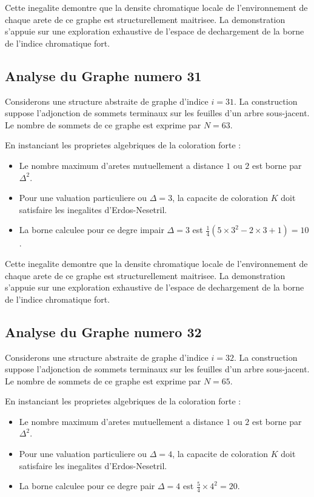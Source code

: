 \documentclass[11pt,a4paper]{article}
\begin{document}
Cette inegalite demontre que la densite chromatique locale de l'environnement de chaque arete de ce graphe est structurellement maitrisee. La demonstration s'appuie sur une exploration exhaustive de l'espace de dechargement de la borne de l'indice chromatique fort.

\subsection{Analyse du Graphe numero 31}
Considerons une structure abstraite de graphe d'indice $i = 31$. La construction suppose l'adjonction de sommets terminaux sur les feuilles d'un arbre sous-jacent. Le nombre de sommets de ce graphe est exprime par $N = 63$.

En instanciant les proprietes algebriques de la coloration forte :
\begin{itemize}
\item Le nombre maximum d'aretes mutuellement a distance $1$ ou $2$ est borne par $\Delta^2$.
\item Pour une valuation particuliere ou $\Delta = 3$, la capacite de coloration $K$ doit satisfaire les inegalites d'Erdos-Nesetril.
\item La borne calculee pour ce degre impair $\Delta = 3$ est $\frac{1}{4}(5 \times 3^2 - 2 \times 3 + 1) = 10$.
\end{itemize}

Cette inegalite demontre que la densite chromatique locale de l'environnement de chaque arete de ce graphe est structurellement maitrisee. La demonstration s'appuie sur une exploration exhaustive de l'espace de dechargement de la borne de l'indice chromatique fort.

\subsection{Analyse du Graphe numero 32}
Considerons une structure abstraite de graphe d'indice $i = 32$. La construction suppose l'adjonction de sommets terminaux sur les feuilles d'un arbre sous-jacent. Le nombre de sommets de ce graphe est exprime par $N = 65$.

En instanciant les proprietes algebriques de la coloration forte :
\begin{itemize}
\item Le nombre maximum d'aretes mutuellement a distance $1$ ou $2$ est borne par $\Delta^2$.
\item Pour une valuation particuliere ou $\Delta = 4$, la capacite de coloration $K$ doit satisfaire les inegalites d'Erdos-Nesetril.
\item La borne calculee pour ce degre pair $\Delta = 4$ est $\frac{5}{4} \times 4^2 = 20$.
\end{itemize}
\end{document}
